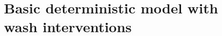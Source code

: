 \documentclass[12pt,a4paper]{article}
\theoremstyle{plain}%
\theoremstyle{definition}
\theoremstyle{remark}
\begin{document}
	
	
%	
	\section{Basic deterministic model with wash interventions}\label{sec:model1}
\end{document}
